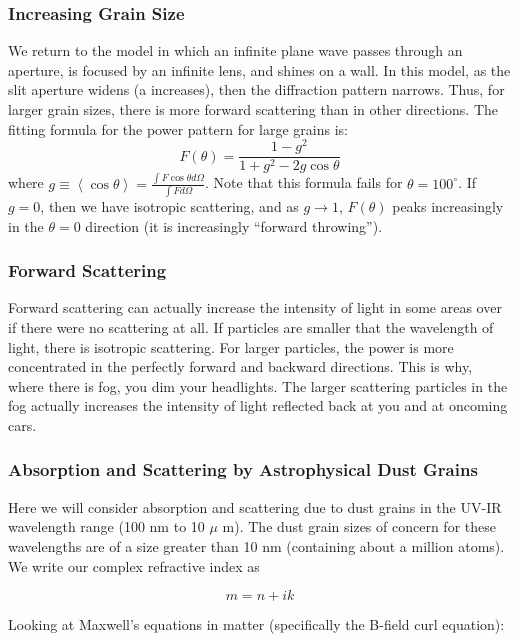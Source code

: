 \documentclass{article}
\def\mean#1{\left\langle {#1}\right\rangle}
\begin{document}
\subsubsection*{Increasing Grain Size}

We return to the model in which an infinite plane wave passes through an
aperture, is focused by an infinite lens, and shines on a wall.  In this
model, as the slit aperture widens (a increases), then the diffraction
pattern narrows.  Thus, for larger grain sizes, there is more forward
scattering than in other directions.  The fitting formula for the power
pattern for large grains is:
$$F(\theta)=\frac{1-g^2}{1+g^2-2g\cos\theta}$$
where $g\equiv\mean{\cos\theta}=\frac{\int{F\cos\theta d\Omega}}{
\int{Fd\Omega}}$. Note that this formula fails for $\theta=100^\circ$.  If
$g=0$, then we have isotropic scattering, and as $g\to1$, $F(\theta)$ peaks
increasingly in the $\theta=0$ direction (it is increasingly 
``forward throwing'').

\subsubsection*{Forward Scattering}

Forward scattering can actually increase the intensity of light in some areas
over if there were no scattering at all.
If particles are smaller that the wavelength of light, there is isotropic
scattering.  For larger particles, the power is more concentrated in the 
perfectly forward and backward directions.  This is why, where there is fog,
you dim your headlights.  The larger scattering particles in the fog actually
increases the intensity of light reflected back at you and at oncoming cars.

\subsubsection*{Absorption and Scattering by Astrophysical Dust Grains}

Here we will consider absorption and scattering due to dust grains in the UV-IR wavelength range (100 nm to 10 $\mu$ m). 
The dust grain sizes of concern for these wavelengths are of a size greater than 10 nm (containing about a million atoms). 
We write our complex refractive index as 

\begin{equation}
m = n + ik
\end{equation}

Looking at Maxwell's equations in matter (specifically the B-field curl equation):
\end{document}
